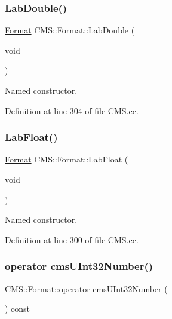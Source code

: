 \subsubsection{\texorpdfstring{Lab\+Double()}{LabDouble()}}
{\footnotesize\ttfamily \hyperlink{class_c_m_s_1_1_format}{Format} C\+M\+S\+::\+Format\+::\+Lab\+Double (\begin{DoxyParamCaption}\item[{void}]{ }\end{DoxyParamCaption})\hspace{0.3cm}{\ttfamily [static]}}



Named constructor. 



Definition at line 304 of file C\+M\+S.\+cc.

\mbox{\label{class_c_m_s_1_1_format_aeecc7328f77c9233c0b163f12974bdbd}} 
\subsubsection{\texorpdfstring{Lab\+Float()}{LabFloat()}}
{\footnotesize\ttfamily \hyperlink{class_c_m_s_1_1_format}{Format} C\+M\+S\+::\+Format\+::\+Lab\+Float (\begin{DoxyParamCaption}\item[{void}]{ }\end{DoxyParamCaption})\hspace{0.3cm}{\ttfamily [static]}}



Named constructor. 



Definition at line 300 of file C\+M\+S.\+cc.

\mbox{\label{class_c_m_s_1_1_format_a85f7ad0c38e3b46e55e541c7233edbf2}} 
\subsubsection{\texorpdfstring{operator cms\+U\+Int32\+Number()}{operator cmsUInt32Number()}}
{\footnotesize\ttfamily C\+M\+S\+::\+Format\+::operator cms\+U\+Int32\+Number (\begin{DoxyParamCaption}{ }\end{DoxyParamCaption}) const\hspace{0.3cm}{\ttfamily [inline]}}



